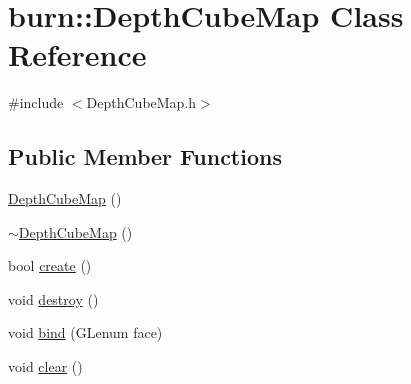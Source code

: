 \hypertarget{classburn_1_1_depth_cube_map}{\section{burn\-:\-:Depth\-Cube\-Map Class Reference}
\label{classburn_1_1_depth_cube_map}
}


{\ttfamily \#include $<$Depth\-Cube\-Map.\-h$>$}

\subsection*{Public Member Functions}
\begin{DoxyCompactItemize}
\item 
\hyperlink{classburn_1_1_depth_cube_map_aafb7faa6ec3f5fd19593f7af49f628ec}{Depth\-Cube\-Map} ()
\item 
\hyperlink{classburn_1_1_depth_cube_map_a8047ed0788001fb2179503f29d50e678}{$\sim$\-Depth\-Cube\-Map} ()
\item 
bool \hyperlink{classburn_1_1_depth_cube_map_af3c2fe1452d388922010a045dfa9ba5c}{create} ()
\item 
void \hyperlink{classburn_1_1_depth_cube_map_a890f2ce335fb14c929bd54c3d86d3eff}{destroy} ()
\item 
void \hyperlink{classburn_1_1_depth_cube_map_a34bc61ae6a655ad80e910d74cb658d80}{bind} (G\-Lenum face)
\item 
void \hyperlink{classburn_1_1_depth_cube_map_a055a9dae5a5ea127e7f93af37393ac1c}{clear} ()
\end{DoxyCompactItemize}



